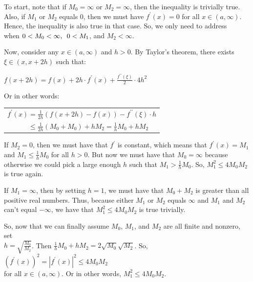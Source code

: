 \documentclass{book}
\newcommand{\pracTwo}{
   \color{Orange}%
   \fontsize{12}{14}\selectfont%
}
\newenvironment{myIndent}{%
   \begin{adjustwidth}{2.5em}{0em}%
}{%
   \end{adjustwidth}%
}
\newcommand{\pprime}{{\prime\prime}}
\newcommand{\myHS}{ \hspace{0.5em}}
\newcommand{\retTwo}{\hfill\bigbreak}
\begin{document}
{\begin{myIndent}\pracTwo
   To start, note that if $M_0 = \infty$ or $M_2 = \infty$, then the inequality is trivially true.\\ Also, if $M_1$ or $M_2$ equals $0$, then we must have $f^\prime(x) = 0$ for all $x \in (a, \infty)$.\\ Hence, the inequality is also true in that case. So, we only need to address\\ when $0 < M_0 < \infty,\myHS 0 < M_1$, \hspace{0.1em}and $M_2 < \infty$.
   \retTwo

   Now, consider any $x \in (a, \infty)$ and $h > 0$. By Taylor's theorem, there exists\\ $\xi \in (x, x + 2h)$ such that:

   {\center $f(x + 2h) = f(x) + 2h \cdot f^\prime(x) + \frac{f^\pprime(\xi)}{2}\cdot 4h^2$\retTwo\par}

   Or in other words:
   \begin{center}
      \begin{tabular}{l}
         $f^\prime(x) = \frac{1}{2h}(f(x + 2h) - f(x)) - f^\pprime(\xi)\cdot h$ \\ [5pt]
         $\phantom{f^\prime(x)} \leq \frac{1}{2h}(M_0 + M_0) + hM_2 = \frac{1}{h}M_0 + hM_2$
      \end{tabular}\retTwo
   \end{center}

   If $M_2 = 0$, then we must have that $f^\prime$ is constant, which means that $f^\prime(x) = M_1$\\ and $M_1 \leq \frac{1}{h}M_0$ for all $h > 0$. But now we must have that $M_0 = \infty$ because\\ otherwise we could pick a large enough $h$ such that $M_1 > \frac{1}{h}M_0$. So, $M_1^2 \leq 4M_0M_2$\\ is true again.\retTwo

   If $M_1 = \infty$, then by setting $h = 1$, we must have that $M_0 + M_2$ is greater than all\\ positive real numbers. Thus, because either $M_1$ or $M_2$ equals $\infty$ and $M_1$ and $M_2$\\ can't equal $-\infty$, we have that $M_1^2 \leq 4M_0M_2$ is true trivially.\retTwo

   So, now that we can finally assume $M_0$, $M_1$, and $M_2$ are all finite and nonzero, set\\ $h = \sqrt{\frac{M_0}{M_2}}$. Then $\frac{1}{h}M_0 + hM_2 = 2\sqrt{M_0}\sqrt{M_2}$. So, $(f^\prime(x))^2 = |f^\prime(x)|^2 \leq 4M_0M_2$\\ for all $x \in (a, \infty)$. Or in other words, $M_1^2 \leq 4M_0M_2$.
\end{myIndent}}
\end{document}
